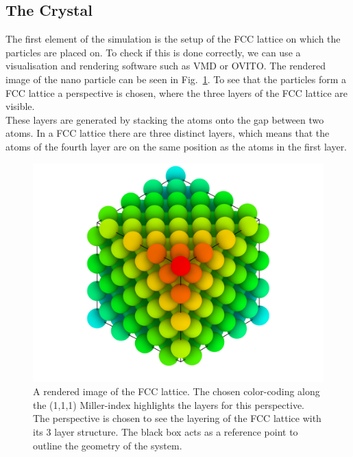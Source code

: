 \documentclass[12pt]{article}
\begin{document}
\subsection{The Crystal}
The first element of the simulation is the setup of the FCC lattice on which the particles are placed on. To check if this is done correctly, we can
use a visualisation and rendering software such as VMD\cite{Humphrey1996} or OVITO\cite{Stukowski2010}. The rendered image of the nano particle 
can be seen in Fig.~\ref{fig:glass}. To see that the particles form a FCC lattice a perspective is chosen, where the three layers of the FCC lattice
are visible. \\
These layers are generated by stacking the atoms onto the gap between two atoms. In a FCC lattice there are three distinct layers, which means that
the atoms of the fourth layer are on the same position as the atoms in the first layer.
\begin{figure}[h]
    \begin{center}
        \includegraphics[scale=0.2]{images/fcc_rendering_layer_newcoloring.png}
        \caption{A rendered image of the FCC lattice. The chosen color-coding along the (1,1,1) Miller-index 
                highlights the layers for this perspective. The perspective is
                chosen to see the layering of the FCC lattice with its 3 layer structure. The black box acts as a reference point to outline the 
                geometry of the system.}
        \label{fig:glass}
    \end{center}
\end{figure}
\end{document}
